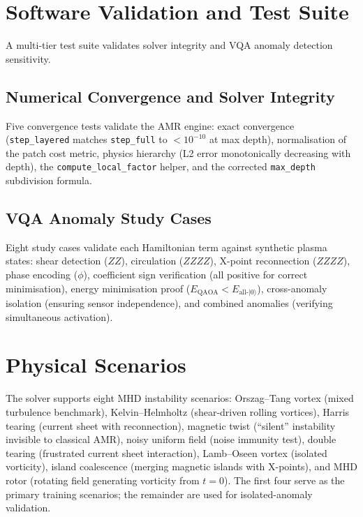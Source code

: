 \documentclass[12pt, a4paper, oneside]{report}
\begin{document}
\section{Software Validation and Test Suite}
\label{sec:test-suite}

A multi-tier test suite validates solver integrity and VQA anomaly detection sensitivity.

\subsection{Numerical Convergence and Solver Integrity}

Five convergence tests validate the AMR engine: exact convergence (\texttt{step\_layered} matches \texttt{step\_full} to $< 10^{-10}$ at max depth), normalisation of the patch cost metric, physics hierarchy (L2 error monotonically decreasing with depth), the \texttt{compute\_local\_factor} helper, and the corrected \texttt{max\_depth} subdivision formula.

\subsection{VQA Anomaly Study Cases}
\label{sec:vqa-study-cases}

Eight study cases validate each Hamiltonian term against synthetic plasma states: shear detection ($ZZ$), circulation ($ZZZZ$), X-point reconnection ($ZZZZ$), phase encoding ($\phi$), coefficient sign verification (all positive for correct minimisation), energy minimisation proof ($E_{\text{QAOA}} < E_{\text{all-}|0\rangle}$), cross-anomaly isolation (ensuring sensor independence), and combined anomalies (verifying simultaneous activation).

\section{Physical Scenarios}
\label{sec:physical-scenarios}

The solver supports eight MHD instability scenarios: Orszag--Tang vortex (mixed turbulence benchmark), Kelvin--Helmholtz (shear-driven rolling vortices), Harris tearing (current sheet with reconnection), magnetic twist (``silent'' instability invisible to classical AMR), noisy uniform field (noise immunity test), double tearing (frustrated current sheet interaction), Lamb--Oseen vortex (isolated vorticity), island coalescence (merging magnetic islands with X-points), and MHD rotor (rotating field generating vorticity from $t = 0$). The first four serve as the primary training scenarios; the remainder are used for isolated-anomaly validation.
\end{document}
